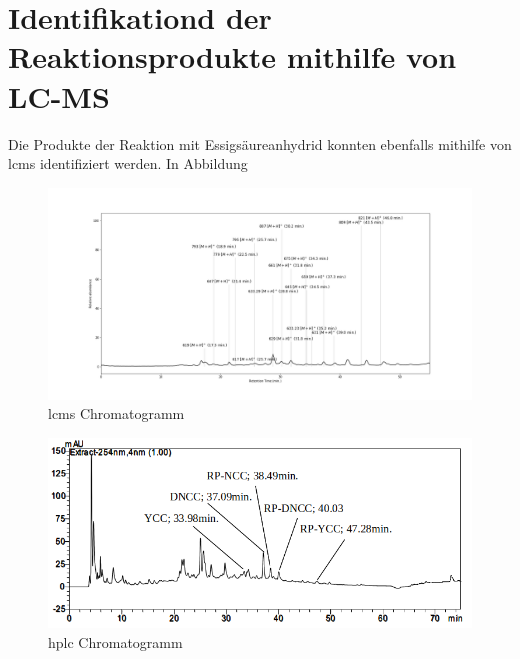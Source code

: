 \section{Identifikationd der Reaktionsprodukte mithilfe von LC-MS}

Die Produkte der Reaktion mit Essigsäureanhydrid konnten ebenfalls mithilfe von \gls{lcms} identifiziert werden. In Abbildung 

\begin{figure}[!htbp]
  \includegraphics[width=\textwidth]{figures/Kapitel6/Reaktion3h/Kuerbis_Analyse_Reaktion3h_Ganzes_Spektrum.png}
  \caption[LC-MS Chromatogramm nach 3h Reaktionsdauer, Quelle: Author]{\gls{lcms} Chromatogramm}
  \label{fig:LCMSCChromatogrammRP}
\end{figure}


\begin{figure}[!htbp]
  \includegraphics[width=\textwidth]{figures/Kapitel6/Reaktion3h/HPLC_Chromatogramm.png}
  \caption[HPLC Chromatogramm nach 3h Reaktionsdauer, Quelle: Author]{\gls{hplc} Chromatogramm}
  \label{fig:HPLCChromatogrammRP}
\end{figure}

